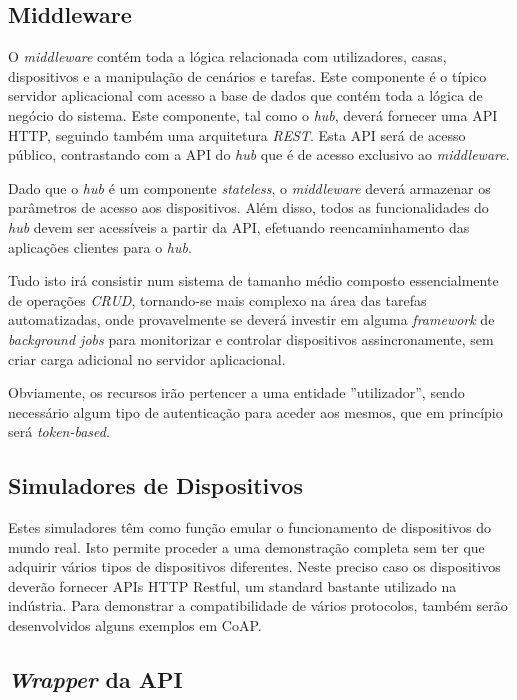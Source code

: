 \subsection{Middleware}

O \textit{middleware} contém toda a lógica relacionada com utilizadores, casas, dispositivos e a manipulação de cenários e tarefas. Este componente é o típico servidor aplicacional com acesso a base de dados que contém toda a lógica de negócio do sistema. Este componente, tal como o \textit{hub}, deverá fornecer uma API HTTP, seguindo também uma arquitetura \textit{REST}. Esta API será de acesso público, contrastando com a API do \textit{hub} que é de acesso exclusivo ao \textit{middleware}.

Dado que o \textit{hub} é um componente \textit{stateless}, o \textit{middleware} deverá armazenar os parâmetros de acesso aos dispositivos. Além disso, todos as funcionalidades do \textit{hub} devem ser acessíveis a partir da API, efetuando reencaminhamento das aplicações clientes para o \textit{hub}.

Tudo isto irá consistir num sistema de tamanho médio composto essencialmente de operações \textit{CRUD}, tornando-se mais complexo na área das tarefas automatizadas, onde provavelmente se deverá investir em alguma \textit{framework} de \textit{background jobs} para monitorizar e controlar dispositivos assincronamente, sem criar carga adicional no servidor aplicacional.

Obviamente, os recursos irão pertencer a uma entidade ''utilizador'', sendo necessário algum tipo de autenticação para aceder aos mesmos, que em princípio será \textit{token-based}.
\subsection{Simuladores de Dispositivos}

Estes simuladores têm como função emular o funcionamento de dispositivos do mundo real. Isto permite proceder a uma demonstração completa sem ter que adquirir vários tipos de dispositivos diferentes. Neste preciso caso os dispositivos deverão fornecer APIs HTTP Restful, um standard bastante utilizado na indústria. Para demonstrar a compatibilidade de vários protocolos, também serão desenvolvidos alguns exemplos em CoAP.

\subsection{\textit{Wrapper} da API}


